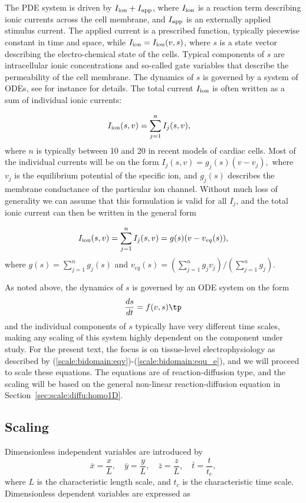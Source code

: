 \documentclass[graybox,envcountchap,sectrefs,final]{svmonodo}
\begin{document}
The PDE system is driven by $I_{\rm{ion}} + I_{\rm{app}}$, where
$I_{\rm{ion}}$ is a reaction term describing ionic currents across the
cell membrane, and $ I_{\rm{app}}$ is an externally applied stimulus
current. The applied current is a prescribed function,
typically piecewise constant in time and space, while
$I_{\rm{ion}} = I_{\rm{ion}}(v,s)$, where $s$ is a state vector
describing the electro-chemical state of the cells. Typical components
of $s$ are intracellular ionic concentrations and so-called gate variables that
describe the permeability of the cell membrane. The dynamics of $s$ is
governed by a system of ODEs, see for instance \cite{Sundnes_2006} for
details. The total
current $I_{\rm{ion}}$ is often written as a sum of individual
ionic currents:

\begin{align} I_{\rm{ion}}(s,v) &= \sum_{j=1}^n I_{j}(s,v),
\label{scale:bidomain:ion1}
\end{align}
where $n$ is typically between 10 and 20 in recent models of cardiac
cells. Most of the individual currents will be on the form
$ I_{j}(s,v) = g_j(s)(v-v_j), $
where $v_j$ is the equilibrium potential of the specific ion, and
$g_j(s)$ describes the membrane conductance of the particular ion channel. Without
much loss of generality we can assume that this formulation is valid
for all $I_{j}$, and the total ionic current can then be written in the
general form

\[
I_{\rm{ion}}(s,v) = \sum_{j=1}^n I_{j}(s,v) = g(s)(v-v_{eq}(s)) ,
\]
where $g(s) = \sum_{j=1}^n g_j(s)$ and $v_{eq}(s) = (\sum_{j=1}^n g_j
v_j)/(\sum_{j=1}^n g_j)$.

As noted above, the dynamics of $s$ is governed by an ODE system on
the form
\[
\frac{ds}{dt} = f(v,s) \tp
\]
and the individual components of $s$ typically have very
different time scales, making any scaling of this system highly dependent on the
component under study. For the present text, the focus is on
tissue-level electrophysiology as described by
(\ref{scale:bidomain:eqv})-(\ref{scale:bidomain:equ_e}), and we will proceed
to scale these equations. The equations are of
reaction-diffusion type, and the scaling will be based on the general
non-linear reaction-diffusion equation in Section~\ref{sec:scale:diffu:homo1D}.

\subsection{Scaling}

Dimensionless independent variables are introduced by
\[ \bar x = \frac{x}{L},\quad
\bar y = \frac{y}{L},\quad \bar z = \frac{z}{L},\quad
\bar t = \frac{t}{t_c},\]
where $L$ is the characteristic length scale, and $t_c$ is the
characteristic time scale. Dimensionless dependent variables are
expressed as
\end{document}
